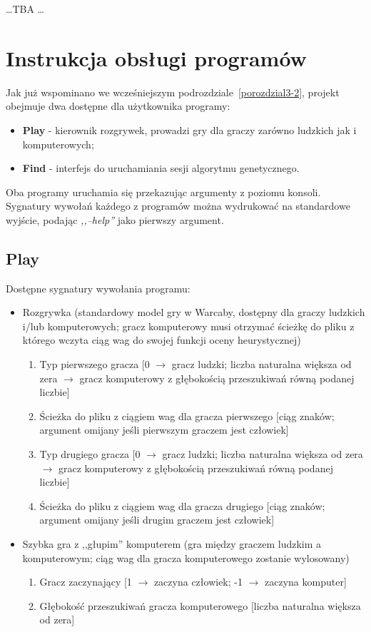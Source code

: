 \ldots TBA \ldots

\section{Instrukcja obsługi programów}

Jak już wspominano we wcześniejszym podrozdziale~\ref{porozdzial3-2}, projekt obejmuje dwa dostępne dla użytkownika programy:
\begin{itemize}
    \item \textbf{Play} - kierownik rozgrywek, prowadzi gry dla graczy zarówno ludzkich jak i komputerowych;
    \item \textbf{Find} - interfejs do uruchamiania sesji algorytmu genetycznego.
\end{itemize}
Oba programy uruchamia się przekazując argumenty z poziomu konsoli. Sygnatury wywołań każdego z programów można wydrukować na standardowe wyjście, podając \textit{,,--help''} jako pierwszy argument.

\subsection{Play}

Dostępne sygnatury wywołania programu:
\begin{itemize}
    \item Rozgrywka (standardowy model gry w Warcaby, dostępny dla graczy ludzkich i/lub komputerowych; gracz komputerowy musi otrzymać ścieżkę do pliku z którego wczyta ciąg wag do swojej funkcji oceny heurystycznej)
    \begin{enumerate}
        \item Typ pierwszego gracza [0 $\rightarrow$ gracz ludzki; liczba naturalna większa od zera $\rightarrow$ gracz komputerowy z głębokością przeszukiwań równą podanej liczbie]
        \item Ścieżka do pliku z ciągiem wag dla gracza pierwszego [ciąg znaków; argument omijany jeśli pierwszym graczem jest człowiek]
        \item Typ drugiego gracza [0 $\rightarrow$ gracz ludzki; liczba naturalna większa od zera $\rightarrow$ gracz komputerowy z głębokością przeszukiwań równą podanej liczbie]
        \item Ścieżka do pliku z ciągiem wag dla gracza drugiego [ciąg znaków; argument omijany jeśli drugim graczem jest człowiek]
    \end{enumerate}
    \item Szybka gra z ,,głupim'' komputerem (gra między graczem ludzkim a komputerowym; ciąg wag dla gracza komputerowego zostanie wylosowany)
    \begin{enumerate}
        \item Gracz zaczynający [1 $\rightarrow$ zaczyna człowiek; -1 $\rightarrow$ zaczyna komputer]
        \item Głębokość przeszukiwań gracza komputerowego [liczba naturalna większa od zera]
    \end{enumerate}
\end{itemize}

